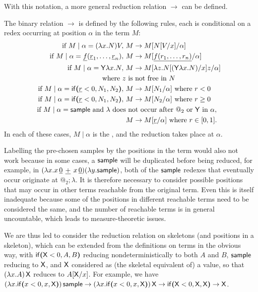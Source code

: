 With this notation, a more general reduction relation $\to$ can be defined.
\begin{definition}
\label{def:more general red}
The binary relation $\to$ is defined by the following rules, each is conditional on a redex occurring at position $\alpha$ in the term $M$:
\begin{align*}
  \text{if } M \mid \alpha = (\lambda x.N) V,\ & M \to M[N[V/x]/\alpha] \\
  \text{if } M \mid \alpha = \underline f (\underline r_1, \dots , \underline r_n),\ & M \to M[\underline{f(r_1,\dots,r_n)}/\alpha] \\
  \text{if } M \mid \alpha = \mathsf{Y} \lambda x. N,\ & M \to M[\lambda z. N[(\mathsf{Y} \lambda x. N)/x] z/\alpha]\\ \text{where }z&\text{ is not free in $N$}\\
  \text{if } M \mid \alpha = \mathsf{if}\boldsymbol{(}\underline r < 0, N_1, N_2\boldsymbol{)},\ & M \to M[N_1/\alpha] \text{ where }r < 0 \\
  \text{if } M \mid \alpha = \mathsf{if}\boldsymbol{(}\underline r < 0, N_1, N_2\boldsymbol{)},\ & M \to M[N_2/\alpha] \text{ where }r \geq 0 \\
  \text{if } M \mid \alpha = \mathsf{sample} \text{ and $\lambda$ does}&\text{ not occur after $@_2$ or $\mathsf{Y}$ in $\alpha$},\\ & M \to M[\underline r/\alpha] \text{ where } r \in [0,1].
\end{align*}
In each of these cases, $M \mid \alpha$ is the , and the reduction takes place at $\alpha$.
\end{definition}

\medskip
Labelling the pre-chosen samples by the positions in the term would also not work because in some cases, a $\mathsf{sample}$ will be duplicated before being reduced, for example, in $(\lambda x. x \, {\underline 0} \, \mathbin{\underline{+}} \, {x \, \underline 0}) (\lambda y. \mathsf{sample})$, both of the $\mathsf{sample}$ redexes that eventually occur originate at $@_2 ; \lambda$. 
It is therefore necessary to consider possible positions that may occur in other terms reachable from the original term. 
Even this is itself inadequate because some of the positions in different reachable terms need to be considered the same, and the number of reachable terms is in general uncountable, which leads to measure-theoretic issues.

We are thus led to consider the reduction relation on skeletons (and positions in a skeleton), which can be extended from the definitions on terms in the obvious way, with $\mathsf{if}\boldsymbol{(}\mathsf{X} < 0, A, B\boldsymbol{)}$ reducing nondeterministically to both $A$ and $B$, $\mathsf{sample}$ reducing to $\mathsf{X}$, and $\mathsf{X}$ considered as (the skeletal equivalent of) a value, so that $(\lambda x.A) \, \mathsf{X}$ reduces to $A[\mathsf{X} / x]$.
For example, we have 
\(
(\lambda x . \mathsf{if}\boldsymbol{(}x < 0, x, \mathsf{X}\boldsymbol{)}) \, \mathsf{sample}
\to
(\lambda x . \mathsf{if}\boldsymbol{(}x < 0, x, \mathsf{X}\boldsymbol{)}) \, \mathsf{X}
\to
\mathsf{if}\boldsymbol{(}\mathsf{X} < 0, \mathsf{X}, \mathsf{X}\boldsymbol{)}
\to
\mathsf{X}
\).

